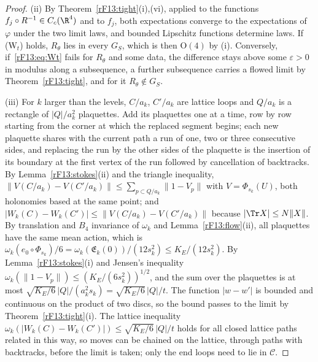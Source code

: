 \begin{proof}
(ii) By Theorem~\ref{rF13:tight}(i),(vi), applied to the functions
$f_j\circ R^{-1}\in C_c(\R^4)$ and to $f_j$, both expectations converge to the
expectations of $\varphi$ under the two limit laws, and bounded Lipschitz
functions determine laws. If (W$_t$) holds, $R_\theta$ lies in every $G_S$,
which is then $\mathrm O(4)$ by (i). Conversely, if~\eqref{rF13:eq:Wt}
fails for $R_\theta$ and some data, the difference stays above some
$\varepsilon>0$ in modulus along a subsequence, a further subsequence
carries a flowed limit by Theorem~\ref{rF13:tight}, and for it
$R_\theta\notin G_S$.

(iii) For $k$ larger than the levels, $C/a_k$, $C'/a_k$ are lattice loops and
$Q/a_k$ is a rectangle of $|Q|/a_k^2$ plaquettes. Add its plaquettes one at
a time, row by row starting from the corner at which the replaced segment
begins; each new plaquette shares with the current path a run of one, two or
three consecutive sides, and replacing the run by the other sides of the
plaquette is the insertion of its boundary at the first vertex of the run
followed by cancellation of backtracks. By Lemma~\ref{rF13:stokes}(ii) and the triangle inequality,
$\|V(C/a_k)-V(C'/a_k)\|\le\sum_{p\subset Q/a_k}\|1-V_p\|$ with $V=
\Phi_{s_k}(U)$, both holonomies based at the same point; and $|W_k(C)-
W_k(C')|\le\|V(C/a_k)-V(C'/a_k)\|$ because $|\Tr X|\le N\|X\|$. By
translation and $B_4$ invariance of $\omega_k$ and Lemma~\ref{rF13:flow}(ii),
all plaquettes have the same mean action, which is $\omega_k(e_0\circ
\Phi_{s_k})/6=\omega_k(\mathfrak E_k(0))/(12s_k^2)\le K_E/(12s_k^2)$. By
Lemma~\ref{rF13:stokes}(i) and Jensen's inequality $\omega_k(\|1-V_p\|)\le
(K_E/(6s_k^2))^{1/2}$, and the sum over the plaquettes is at most
$\sqrt{K_E/6}\,|Q|/(a_k^2s_k)=\sqrt{K_E/6}\,|Q|/t$. The function $|w-w'|$ is
bounded and continuous on the product of two discs, so the bound passes to
the limit by Theorem~\ref{rF13:tight}(i). The lattice inequality
$\omega_k(|W_k(C)-W_k(C')|)\le\sqrt{K_E/6}\,|Q|/t$ holds for all closed lattice
paths related in this way, so moves can be chained on the lattice, through
paths with backtracks, before the limit is taken; only the end loops need
to lie in $\mathcal C$.


\end{proof}
